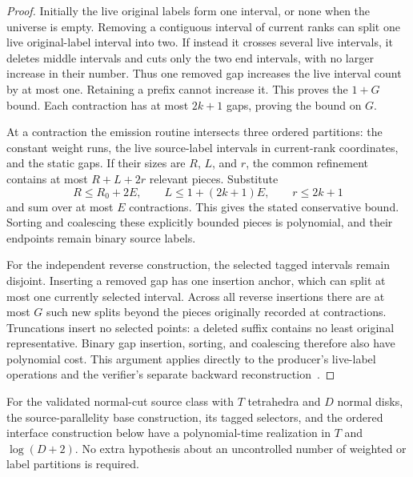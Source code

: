 \begin{proof}
Initially the live original labels form one interval, or none when the
universe is empty.  Removing a contiguous interval of current ranks can
split one live original-label interval into two.  If instead it crosses
several live intervals, it deletes middle intervals and cuts only the two
end intervals, with no larger increase in their number.  Thus one removed
gap increases the live interval count by at most one.  Retaining a prefix
cannot increase it.  This proves the $1+G$ bound.  Each contraction has at
most $2k+1$ gaps, proving the bound on $G$.

At a contraction the emission routine intersects three ordered partitions:
the constant weight runs, the live source-label intervals in current-rank
coordinates, and the static gaps.  If their sizes are $R$, $L$, and $r$,
the common refinement contains at most $R+L+2r$ relevant pieces.  Substitute
\[
                R\le R_0+2E,\qquad
                L\le1+(2k+1)E,\qquad r\le2k+1
\]
and sum over at most $E$ contractions.  This gives the stated conservative
bound.  Sorting and coalescing these explicitly bounded pieces is
polynomial, and their endpoints remain binary source labels.

For the independent reverse construction, the selected tagged intervals
remain disjoint.  Inserting a removed gap has one insertion anchor, which
can split at most one currently selected interval.  Across all reverse
insertions there are at most $G$ such new splits beyond the pieces originally
recorded at contractions.  Truncations insert no selected points: a deleted
suffix contains no least original representative.  Binary gap insertion,
sorting, and coalescing therefore also have polynomial cost.  This argument
applies directly to the producer's live-label operations and the verifier's
separate backward reconstruction~\cite{ProveIt2026}.
\end{proof}

\begin{corollary}
\label{int:source-polynomial}
For the validated normal-cut source class with $T$ tetrahedra and $D$ normal
disks, the source-parallelity base construction, its tagged selectors, and
the ordered interface construction below have a polynomial-time realization
in $T$ and $\log(D+2)$.  No extra hypothesis about an uncontrolled number
of weighted or label partitions is required.
\end{corollary}

